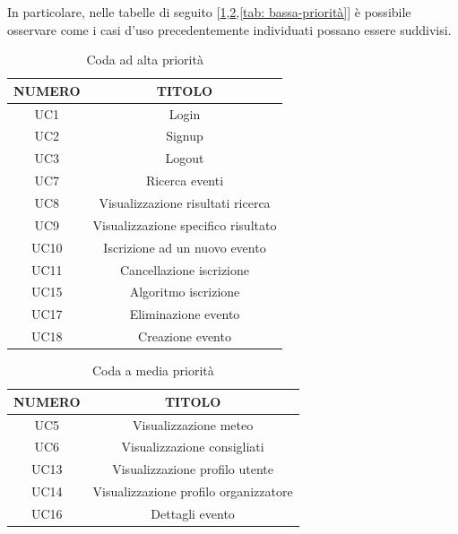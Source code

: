 In particolare, nelle tabelle di seguito [\ref*{tab: alta-priorità},\ref*{tab: media-priorità},\ref*{tab: bassa-priorità}] 
è possibile osservare come i casi d'uso precedentemente individuati possano essere suddivisi.
\clearpage

\begin{table}
\begin{center}
\begin{tabular}{ |c|c|}
 \hline
 \textbf{NUMERO}& \textbf{TITOLO} \\ \hline
 UC1& Login\\ \hline
 UC2& Signup\\ \hline
 UC3& Logout\\ \hline
 UC7 & Ricerca eventi \\ \hline
 UC8 & Visualizzazione risultati ricerca \\ \hline
 UC9 & Visualizzazione specifico risultato \\ \hline
 UC10 & Iscrizione ad un nuovo evento\\ \hline
 UC11 & Cancellazione iscrizione\\ \hline
 UC15& Algoritmo iscrizione\\ \hline
 UC17& Eliminazione evento\\ \hline
 UC18& Creazione evento\\ \hline
\end{tabular}
  \caption{Coda ad alta priorità}
  \label{tab: alta-priorità}
\end{center}
\end{table}

\begin{table}
\begin{center}
\begin{tabular}{ |c|c|}
 \hline
 \textbf{NUMERO}& \textbf{TITOLO} \\ \hline
 UC5& Visualizzazione meteo\\ \hline
 UC6& Visualizzazione consigliati\\ \hline
 UC13&Visualizzazione profilo utente\\ \hline
 UC14&Visualizzazione profilo organizzatore\\ \hline
 UC16& Dettagli evento\\ \hline
\end{tabular}
  \caption{Coda a media priorità}
  \label{tab: media-priorità}
\end{center}
\end{table}

